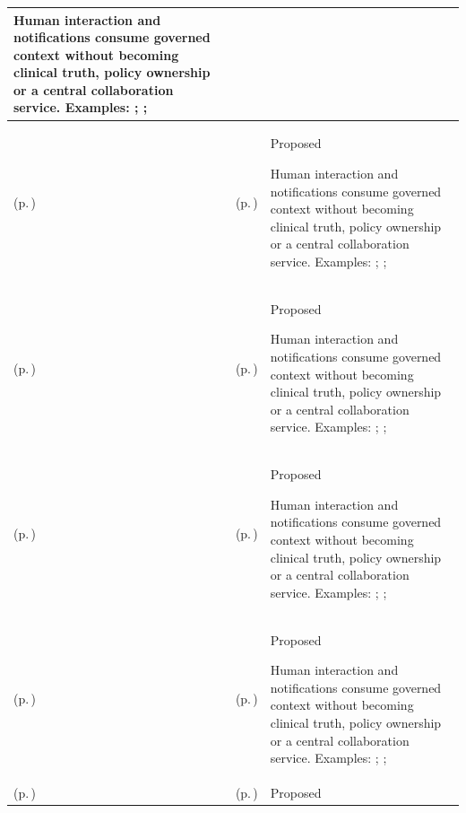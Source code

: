 \begin{longtable}{|>{\raggedright\arraybackslash}p{0.27\TableWidth}|>{\raggedright\arraybackslash}p{0.27\TableWidth}|>{\raggedright\arraybackslash}p{0.46\TableWidth}|}
Human interaction and notifications consume governed context without becoming clinical truth, policy ownership or a central collaboration service. Examples: \nameref{feature:feat-ise-19}; \nameref{function:coordinate-operational-collaboration}; \nameref{service:operational-collaboration-service}\\\hline
\nameref{cap:bec-general-collaboration} (p.\,\pageref{cap:bec-general-collaboration}) & \nameref{cap:ec-09} (p.\,\pageref{cap:ec-09}) & Proposed

Human interaction and notifications consume governed context without becoming clinical truth, policy ownership or a central collaboration service. Examples: \nameref{feature:feat-ise-19}; \nameref{function:coordinate-operational-collaboration}; \nameref{service:operational-collaboration-service}\\\hline
\nameref{cap:bec-presentation-services} (p.\,\pageref{cap:bec-presentation-services}) & \nameref{cap:ec-11} (p.\,\pageref{cap:ec-11}) & Proposed

Human interaction and notifications consume governed context without becoming clinical truth, policy ownership or a central collaboration service. Examples: \nameref{feature:feat-ise-26}; \nameref{function:present-contextual-health-and-operational-information}; \nameref{service:contextual-presentation-service}\\\hline
\nameref{cap:bec-presentation-services} (p.\,\pageref{cap:bec-presentation-services}) & \nameref{cap:ec-06} (p.\,\pageref{cap:ec-06}) & Proposed

Human interaction and notifications consume governed context without becoming clinical truth, policy ownership or a central collaboration service. Examples: \nameref{feature:feat-ise-26}; \nameref{function:present-contextual-health-and-operational-information}; \nameref{service:contextual-presentation-service}\\\hline
\nameref{cap:bec-presentation-services} (p.\,\pageref{cap:bec-presentation-services}) & \nameref{cap:ec-09} (p.\,\pageref{cap:ec-09}) & Proposed

Human interaction and notifications consume governed context without becoming clinical truth, policy ownership or a central collaboration service. Examples: \nameref{feature:feat-ise-26}; \nameref{function:present-contextual-health-and-operational-information}; \nameref{service:contextual-presentation-service}\\\hline
\nameref{cap:bec-information-design-governance} (p.\,\pageref{cap:bec-information-design-governance}) & \nameref{cap:ec-13} (p.\,\pageref{cap:ec-13}) & Proposed


\end{longtable}
